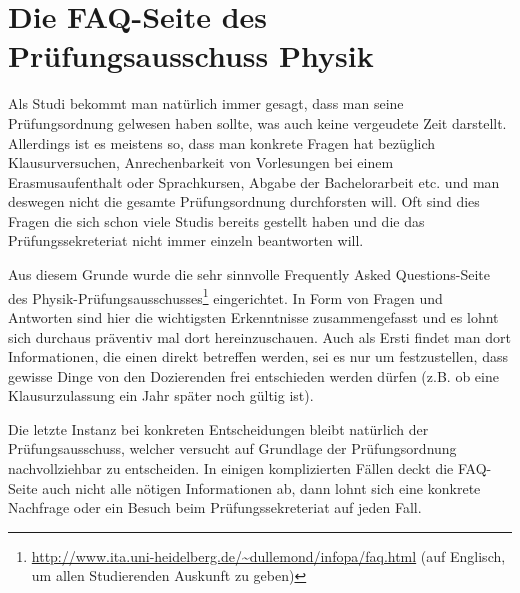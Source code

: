 \section{Die FAQ-Seite des Prüfungsausschuss Physik}
Als Studi bekommt man natürlich immer gesagt, dass man seine Prüfungsordnung gelwesen haben sollte, was auch keine vergeudete Zeit darstellt. Allerdings ist es meistens so, dass man konkrete Fragen hat bezüglich Klausurversuchen, Anrechenbarkeit von Vorlesungen bei einem Erasmusaufenthalt oder Sprachkursen, Abgabe der Bachelorarbeit etc. und man deswegen nicht die gesamte Prüfungsordnung durchforsten will. Oft sind dies Fragen die sich schon viele Studis bereits gestellt haben und die das Prüfungssekreteriat nicht immer einzeln beantworten will. 

Aus diesem Grunde wurde die sehr sinnvolle Frequently Asked Questions-Seite des Physik-Prüfungsausschusses\footnote{\url{http://www.ita.uni-heidelberg.de/~dullemond/infopa/faq.html} (auf Englisch, um allen Studierenden Auskunft zu geben)} eingerichtet. In Form von Fragen und Antworten sind hier die wichtigsten Erkenntnisse zusammengefasst und es lohnt sich durchaus präventiv mal dort hereinzuschauen. Auch als Ersti findet man dort Informationen, die einen direkt betreffen werden, sei es nur um festzustellen, dass gewisse Dinge von den Dozierenden frei entschieden werden dürfen (z.B. ob eine Klausurzulassung ein Jahr später noch gültig ist).

Die letzte Instanz bei konkreten Entscheidungen bleibt natürlich der Prüfungsausschuss, welcher versucht auf Grundlage der Prüfungsordnung nachvollziehbar zu entscheiden. In einigen komplizierten Fällen deckt die FAQ-Seite auch nicht alle nötigen Informationen ab, dann lohnt sich eine konkrete Nachfrage oder ein Besuch beim Prüfungssekreteriat auf jeden Fall.


